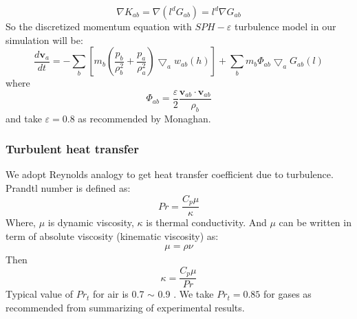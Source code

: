 \documentclass[journal abbreviation, manuscript]{copernicus}
\begin{document}
%
%
\begin{equation}
\nabla K_{ab} = \nabla (l^d G_{ab}) = l^d \nabla G_{ab}
\end{equation}
So the discretized momentum equation with $SPH-\varepsilon$ turbulence model in our simulation will be:
\begin{equation}
\label{eq:SPH-mom-epsilon-turb}
\dfrac{d \textbf{v}_a}{dt} = -\sum_b [m_b (\dfrac{p_b}{\rho_b^2} + \dfrac{p_a}{\rho_a^2}) \bigtriangledown_aw_{a b}(h)] + \sum_b m_b \Phi_{ab}\bigtriangledown_aG_{ab}(l)
\end{equation}
where 
\begin{equation}
\Phi_{ab}=\dfrac{\varepsilon}{2} \dfrac{\textbf{v}_{ab} \cdot \textbf{v}_{ab}}{\rho_b} 
\end{equation}
and take $\varepsilon = 0.8$ as recommended by Monaghan.

\subsubsection{Turbulent heat transfer}
We adopt Reynolds analogy to get heat transfer coefficient due to turbulence.
Prandtl number is defined as:
\begin{equation}
Pr=\dfrac{C_p \mu}{\kappa}
\end{equation}
Where, $\mu$ is dynamic viscosity, $\kappa$ is thermal conductivity. And $\mu$  can be written in term of absolute viscosity (kinematic viscosity) as:
\begin{align}
\mu=\rho \nu
\end{align}
Then
\begin{equation}
\kappa=\dfrac{C_p \mu}{Pr}
\end{equation}
Typical value of $Pr_t$ for air is 0.7 $\sim$ 0.9 . We take $Pr_t=0.85$ for gases as recommended \citet{kays1994turbulent} from summarizing of experimental results. 
\end{document}
